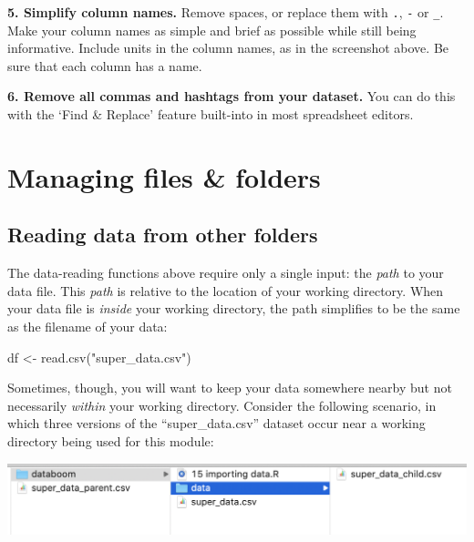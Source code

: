 \documentclass[
]{book}
\newenvironment{Shaded}{\begin{snugshade}}{\end{snugshade}}
\newcommand{\FunctionTok}[1]{\textcolor[rgb]{0.00,0.00,0.00}{#1}}
\newcommand{\NormalTok}[1]{#1}
\newcommand{\OtherTok}[1]{\textcolor[rgb]{0.56,0.35,0.01}{#1}}
\newcommand{\StringTok}[1]{\textcolor[rgb]{0.31,0.60,0.02}{#1}}
\begin{document}
\textbf{5. Simplify column names.} Remove spaces, or replace them with \texttt{.}, \texttt{-} or \texttt{\_}. Make your column names as simple and brief as possible while still being informative. Include units in the column names, as in the screenshot above. Be sure that each column has a name.

\textbf{6. Remove all commas and hashtags from your dataset.} You can do this with the `Find \& Replace' feature built-into in most spreadsheet editors.

\hypertarget{managing-files-folders}{%
\section*{Managing files \& folders}\label{managing-files-folders}}

\hypertarget{reading-data-from-other-folders}{%
\subsection*{Reading data from other folders}\label{reading-data-from-other-folders}}

The data-reading functions above require only a single input: the \emph{path} to your data file. This \emph{path} is relative to the location of your working directory. When your data file is \emph{inside} your working directory, the path simplifies to be the same as the filename of your data:

\begin{Shaded}
\begin{Highlighting}[]
\NormalTok{df }\OtherTok{\textless{}{-}} \FunctionTok{read.csv}\NormalTok{(}\StringTok{"super\_data.csv"}\NormalTok{)}
\end{Highlighting}
\end{Shaded}

Sometimes, though, you will want to keep your data somewhere nearby but not necessarily \emph{within} your working directory. Consider the following scenario, in which three versions of the ``super\_data.csv'' dataset occur near a working directory being used for this module:

\includegraphics{img/csv_wd.png}
\end{document}
